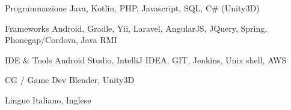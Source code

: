 


\begin{cvskills}


\cvskill
{Programmazione} %
{Java, Kotlin, PHP, Javascript, SQL, C\# (Unity3D)} %


\cvskill
{Frameworks} %
{Android, Gradle, Yii, Laravel, AngularJS, JQuery, Spring, Phonegap/Cordova, Java RMI} %


\cvskill
{IDE \& Tools} %
{Android Studio, IntelliJ IDEA, GIT, Jenkins, Unix shell, AWS} %


\cvskill
{CG / Game Dev} %
{Blender, Unity3D} %


\cvskill
{Lingue} %
{Italiano, Inglese} %


\end{cvskills}
